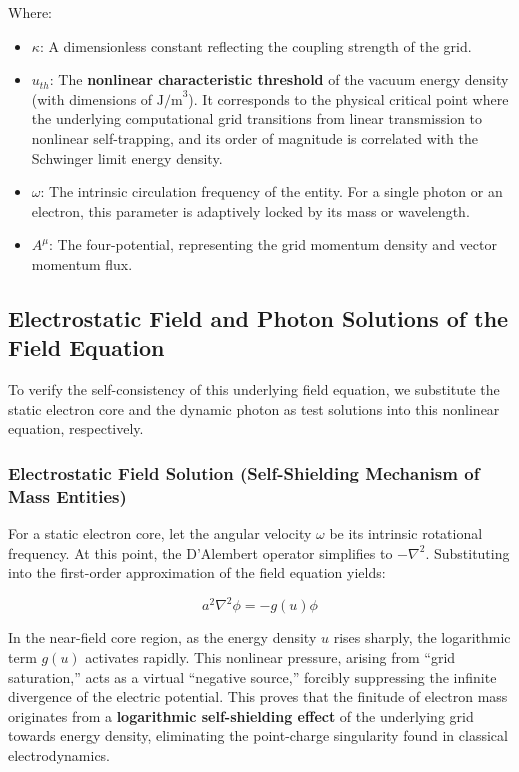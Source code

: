 \documentclass[12pt, a4paper]{article}
\begin{document}
Where:

\begin{itemize}
    \item \textbf{$\kappa$}: A dimensionless constant reflecting the coupling strength of the grid.
    \item \textbf{$u_{th}$}: The \textbf{nonlinear characteristic threshold} of the vacuum energy density (with dimensions of $\text{J/m}^3$). It corresponds to the physical critical point where the underlying computational grid transitions from linear transmission to nonlinear self-trapping, and its order of magnitude is correlated with the Schwinger limit energy density.
    \item \textbf{$\omega$}: The intrinsic circulation frequency of the entity. For a single photon or an electron, this parameter is adaptively locked by its mass or wavelength.
    \item \textbf{$A^\mu$}: The four-potential, representing the grid momentum density and vector momentum flux.
\end{itemize}

\subsection{Electrostatic Field and Photon Solutions of the Field Equation}

To verify the self-consistency of this underlying field equation, we substitute the static electron core and the dynamic photon as test solutions into this nonlinear equation, respectively.

\subsubsection{Electrostatic Field Solution (Self-Shielding Mechanism of Mass Entities)}

For a static electron core, let the angular velocity $\omega$ be its intrinsic rotational frequency. At this point, the D'Alembert operator simplifies to $-\nabla^2$. Substituting into the first-order approximation of the field equation yields:

\begin{equation}
a^2 \nabla^2 \phi = -g(u) \phi 
\end{equation}

In the near-field core region, as the energy density $u$ rises sharply, the logarithmic term $g(u)$ activates rapidly. This nonlinear pressure, arising from ``grid saturation,'' acts as a virtual ``negative source,'' forcibly suppressing the infinite divergence of the electric potential. This proves that the finitude of electron mass originates from a \textbf{logarithmic self-shielding effect} of the underlying grid towards energy density, eliminating the point-charge singularity found in classical electrodynamics.
\end{document}
